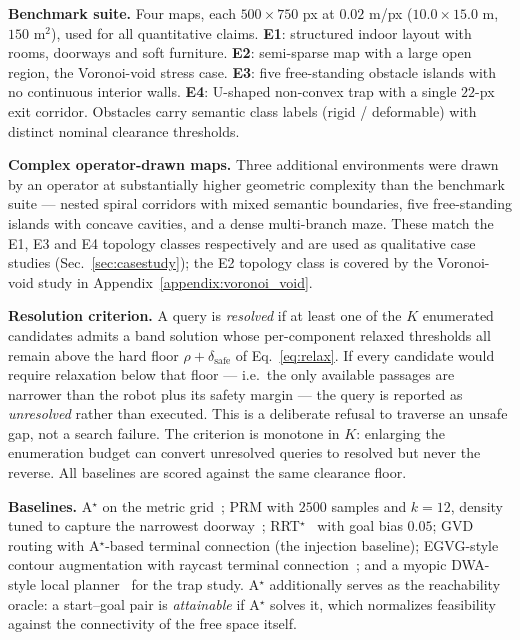 \documentclass[conference]{IEEEtran}
\begin{document}
\textbf{Benchmark suite.} Four maps, each $500\times750$ px at $0.02$ m/px ($10.0\times15.0$ m, $150$ m$^2$), used for all quantitative claims. \textbf{E1}: structured indoor layout with rooms, doorways and soft furniture. \textbf{E2}: semi-sparse map with a large open region, the Voronoi-void stress case. \textbf{E3}: five free-standing obstacle islands with no continuous interior walls. \textbf{E4}: U-shaped non-convex trap with a single $22$-px exit corridor. Obstacles carry semantic class labels (rigid / deformable) with distinct nominal clearance thresholds.

\textbf{Complex operator-drawn maps.} Three additional environments were drawn by an operator at substantially higher geometric complexity than the benchmark suite --- nested spiral corridors with mixed semantic boundaries, five free-standing islands with concave cavities, and a dense multi-branch maze. These match the E1, E3 and E4 topology classes respectively and are used as qualitative case studies (Sec.~\ref{sec:casestudy}); the E2 topology class is covered by the Voronoi-void study in Appendix~\ref{appendix:voronoi_void}.

\textbf{Resolution criterion.} A query is \emph{resolved} if at least one of the $K$ enumerated candidates admits a band solution whose per-component relaxed thresholds all remain above the hard floor $\rho+\delta_{\mathrm{safe}}$ of Eq.~\eqref{eq:relax}. If every candidate would require relaxation below that floor --- i.e.\ the only available passages are narrower than the robot plus its safety margin --- the query is reported as \emph{unresolved} rather than executed. This is a deliberate refusal to traverse an unsafe gap, not a search failure. The criterion is monotone in $K$: enlarging the enumeration budget can convert unresolved queries to resolved but never the reverse. All baselines are scored against the same clearance floor.

\textbf{Baselines.} A$^\star$ on the metric grid~\cite{hart1968}; PRM with $2500$ samples and $k=12$, density tuned to capture the narrowest doorway~\cite{kavraki1996}; RRT$^\star$~\cite{karaman2011} with goal bias $0.05$; GVD routing with A$^\star$-based terminal connection (the injection baseline); EGVG-style contour augmentation with raycast terminal connection~\cite{qi2025egvg}; and a myopic DWA-style local planner~\cite{fox1997} for the trap study. A$^\star$ additionally serves as the reachability oracle: a start--goal pair is \emph{attainable} if A$^\star$ solves it, which normalizes feasibility against the connectivity of the free space itself.
\end{document}
